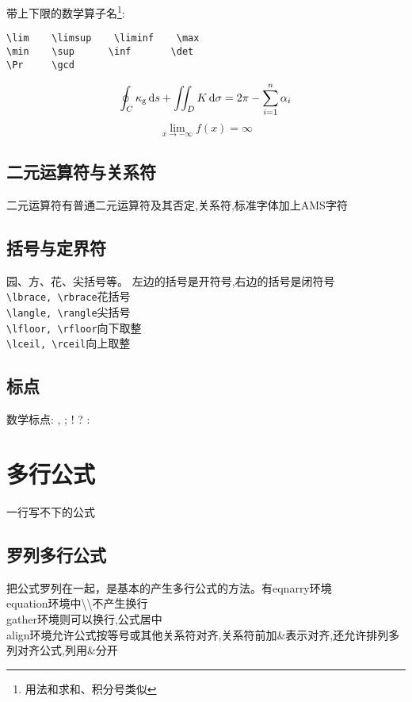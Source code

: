 \documentclass[titlepage, hyperref, UTF8]{ctexart}
\begin{document}
带上下限的数学算子名\footnote{用法和求和、积分号类似}:
\begin{verbatim}
\lim    \limsup    \liminf    \max
\min    \sup      \inf       \det
\Pr     \gcd
\end{verbatim}

\begin{equation}
\oint_C \kappa_\mathrm g \dif s + \iint_D K \dif\sigma = 2\pi - \sum_{i=1}^n \alpha_i
\end{equation}
\begin{equation}
\lim_{x\to -\infty} f(x) = \infty
\end{equation}

\subsection{二元运算符与关系符}
二元运算符有普通二元运算符及其否定,关系符,标准字体加上AMS字符

\subsection{括号与定界符}
园、方、花、尖括号等。
左边的括号是开符号,右边的括号是闭符号\\
\verb|\lbrace, \rbrace|花括号\\
\verb|\langle, \rangle|尖括号\\
\verb|\lfloor, \rfloor|向下取整\\
\verb|\lceil, \rceil|向上取整

\subsection{标点}
数学标点:
, \quad ; \quad ! \quad ? \quad $\colon$


\section{多行公式}
一行写不下的公式
\subsection{罗列多行公式}
把公式罗列在一起，是基本的产生多行公式的方法。有eqnarry环境\\
equation环境中\textbackslash \textbackslash 不产生换行\\
gather环境则可以换行,公式居中\\
align环境允许公式按等号或其他关系符对齐,关系符前加\&表示对齐,还允许排列多列对齐公式,列用\&分开
\end{document}
